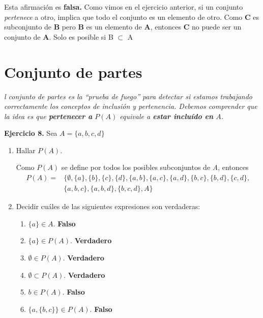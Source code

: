 Esta afirmaci\'on es \textbf{falsa.} Como vimos en el ejercicio anterior, si un conjunto \textit{pertenece} a otro, implica que todo el conjunto es un elemento de otro. Como \textbf{C} es subconjunto de \textbf{B} pero \textbf{B} es un elemento de \textbf{A}, entonces \textbf{C} no puede ser un conjunto de \textbf{A}. Solo es posible si B $\subset$ A

\section{Conjunto de partes}

\textit{l conjunto de partes es la “prueba de fuego” para detectar si estamos trabajando correctamente los conceptos de
inclusión y pertenencia. Debemos comprender que la idea es que \textbf{pertenecer a} $P(A)$ equivale a \textbf{estar incluído en} $A$.}

\textbf{Ejercicio 8.} Sea $A = \{a, b, c, d\}$
\begin{enumerate}
	\item Hallar $P(A)$.
	
	Como $P(A)$ se define por todos los posibles subconjuntos de \textit{A}, entonces 
	\begin{align*}
		P(A) = &\{\emptyset, \{a\}, \{b\}, \{c\}, \{d\}, \{a, b\}, \{a, c\}, \{a, d\}, \{b, c\}, \{b, d\}, \{c, d\},\\
		 &\{a, b, c\}, \{a, b, d\}, \{b, c, d\}, A\}
	\end{align*}
	
	\item Decidir cu\'ales de las siguientes expresiones son verdaderas:
	\begin{enumerate}
		\item $\{a\} \in A$. \textbf{Falso}
		\item $\{a\} \in P(A)$. \textbf{Verdadero}
		\item $\emptyset \in P(A)$. \textbf{Verdadero}
		\item $\emptyset \subset P(A)$. \textbf{Verdadero}
		\item $b \in P(A)$. \textbf{Falso}
		\item $\{a, \{b, c\}\} \in P(A)$. \textbf{Falso}
	\end{enumerate}
\end{enumerate}